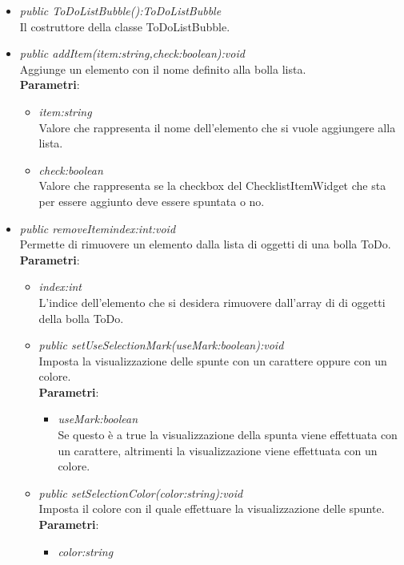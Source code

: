\begin{itemize}
\begin{itemize}
\item \textit{public ToDoListBubble():ToDoListBubble}\\
Il costruttore della classe ToDoListBubble.
\item \textit{public addItem(item:string,check:boolean):void}\\
Aggiunge un elemento con il nome definito alla bolla lista.
\\ \textbf{Parametri}: \begin{itemize}
\item \textit{item:string}\\
Valore che rappresenta il nome dell'elemento che si vuole aggiungere alla lista.
\item \textit{check:boolean}\\
Valore che rappresenta se la checkbox del ChecklistItemWidget che sta per essere aggiunto deve essere spuntata o no.
\end{itemize}
\item \textit{public removeItem{index:int}:void}\\
Permette di rimuovere un elemento dalla lista di oggetti di una bolla ToDo.
\\ \textbf{Parametri}: \begin{itemize}
\item \textit{index:int}\\
L'indice dell'elemento che si desidera rimuovere dall'array di di oggetti della bolla ToDo.
\item \textit{public setUseSelectionMark(useMark:boolean):void}\\
	Imposta la visualizzazione delle spunte con un carattere oppure con un colore.
		\\ \textbf{Parametri}: \begin{itemize}
		\item \textit{useMark:boolean}\\
		Se questo è a true la visualizzazione della spunta viene effettuata con un carattere, altrimenti la visualizzazione viene effettuata con un colore.
		\end{itemize}  
\item \textit{public setSelectionColor(color:string):void}\\
	Imposta il colore con il quale effettuare la visualizzazione delle spunte.
		\\ \textbf{Parametri}: \begin{itemize}
		\item \textit{color:string}\\

\end{itemize}
\end{itemize}
\end{itemize}
\end{itemize}

